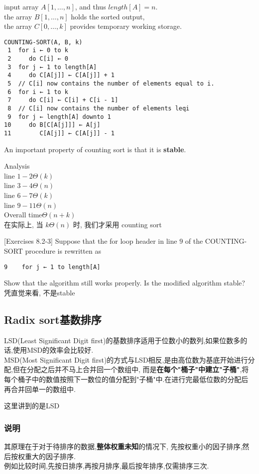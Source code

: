 \documentclass{article}
\begin{document}
input array $A[1,\ldots, n]$, and thus $length[A] = n$.\\
the array $B[1,\ldots,n]$ holds the sorted output, \\
the array $C[0,\ldots,k]$ provides temporary working storage.

\begin{verbatim}
COUNTING-SORT(A, B, k)
 1  for i ← 0 to k
 2     do C[i] ← 0
 3  for j ← 1 to length[A]
 4     do C[A[j]] ← C[A[j]] + 1
 5  // C[i] now contains the number of elements equal to i.
 6  for i ← 1 to k
 7     do C[i] ← C[i] + C[i - 1]
 8  // C[i] now contains the number of elements leqi
 9  for j ← length[A] downto 1
10     do B[C[A[j]]] ← A[j]
11        C[A[j]] ← C[A[j]] - 1
\end{verbatim}

An important property of counting sort is that it is \textbf{stable}.

Analysis\\
line $1-2 \Theta(k)$\\
line $3-4 \Theta(n)$\\
line $6-7 \Theta(k)$\\
line $9-11 \Theta(n)$\\
Overall time$\Theta(n+k)$\\
在实际上, 当 $k\Theta(n)$ 时, 我们才采用 counting sort

[Exercises 8.2-3] Suppose that the for loop header in line $9$ of the COUNTING-SORT procedure is rewritten as
\begin{verbatim}
9	 for j ← 1 to length[A]
\end{verbatim}
Show that the algorithm still works properly. Is the modified algorithm stable?\\
凭直觉来看, 不是stable

\subsection{Radix sort基数排序}
LSD(Least Significant Digit first)的基数排序适用于位数小的数列,如果位数多的话,使用MSD的效率会比较好.\\
MSD(Most Significant Digit first)的方式与LSD相反,是由高位数为基底开始进行分配,但在分配之后并不马上合并回一个数组中,
而是\textbf{在每个"桶子"中建立"子桶"},将每个桶子中的数值按照下一数位的值分配到"子桶"中.在进行完最低位数的分配后再合并回单一的数组中.

这里讲到的是LSD

\subsubsection{说明}
其原理在于对于待排序的数据,\textbf{整体权重未知}的情况下,
先按权重小的因子排序,然后按权重大的因子排序.\\
例如比较时间,先按日排序,再按月排序,最后按年排序,仅需排序三次.
\end{document}
